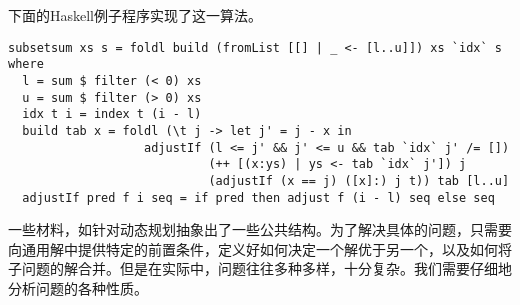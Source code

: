 \documentclass[UTF8]{article}
\begin{document}
下面的Haskell例子程序实现了这一算法。

\lstset{language=Haskell}
\begin{lstlisting}
subsetsum xs s = foldl build (fromList [[] | _ <- [l..u]]) xs `idx` s where
  l = sum $ filter (< 0) xs
  u = sum $ filter (> 0) xs
  idx t i = index t (i - l)
  build tab x = foldl (\t j -> let j' = j - x in
                   adjustIf (l <= j' && j' <= u && tab `idx` j' /= [])
                            (++ [(x:ys) | ys <- tab `idx` j']) j
                            (adjustIf (x == j) ([x]:) j t)) tab [l..u]
  adjustIf pred f i seq = if pred then adjust f (i - l) seq else seq
\end{lstlisting}

一些材料，如\cite{algorithms-fp}针对动态规划抽象出了一些公共结构。为了解决具体的问题，只需要向通用解中提供特定的前置条件，定义好如何决定一个解优于另一个，以及如何将子问题的解合并。但是在实际中，问题往往多种多样，十分复杂。我们需要仔细地分析问题的各种性质。
\end{document}
